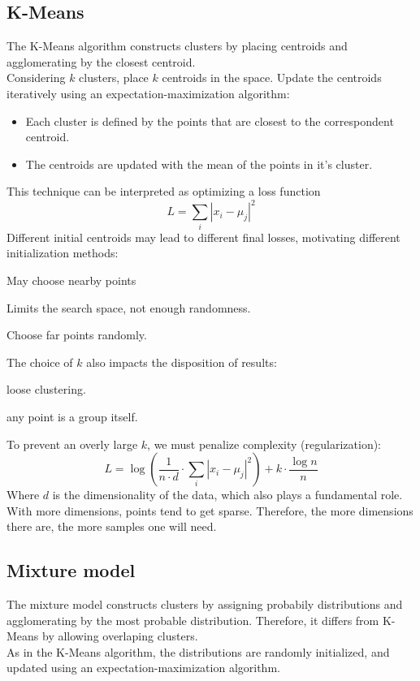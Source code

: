 \documentclass[11pt]{article}
\begin{document}
\subsection{K-Means}
\label{sec:org498583c}
The K-Means algorithm constructs clusters by placing centroids and agglomerating by the
closest centroid. \\
Considering \(k\) clusters, place \(k\) centroids in the space. Update the centroids
iteratively using an expectation-maximization algorithm:
\begin{itemize}[itemsep=0pt]
\item Each cluster is defined by the points that are closest to the correspondent centroid.
\item The centroids are updated with the mean of the points in it's cluster.
\end{itemize}
This technique can be interpreted as optimizing a loss function
\[
  L = \sum_i \left| x_i - \mu_j \right|^2
\]
Different initial centroids may lead to different final losses, motivating different
initialization methods:
\begin{description}[itemsep=0pt]
\item[{Random:}] May choose nearby points
\item[{Distance based:}] Limits the search space, not enough randomness.
\item[{Random and distance based:}] Choose far points randomly.
\end{description}
The choice of \(k\) also impacts the disposition of results:
\begin{description}[itemsep=0pt]
\item[{Small \(k\):}] loose clustering.
\item[{Large \(k\):}] any point is a group itself.
\end{description}
To prevent an overly large \(k\), we must penalize complexity (regularization):
\[
  L = \log \left( \frac{1}{n \cdot d} \cdot \sum_i \left| x_i - \mu_j \right|^2 \right) + k \cdot \frac{\log{n}}{n}
\]
Where \(d\) is the dimensionality of the data, which also plays a fundamental role. With
more dimensions, points tend to get sparse. Therefore, the more dimensions there are,
the more samples one will need.
\subsection{Mixture model}
\label{sec:orgf5bdcb7}
The mixture model constructs clusters by assigning probabily distributions and
agglomerating by the most probable distribution. Therefore, it differs from K-Means by
allowing overlaping clusters. \\
As in the K-Means algorithm, the distributions are randomly initialized, and updated
using an expectation-maximization algorithm.
\end{document}
